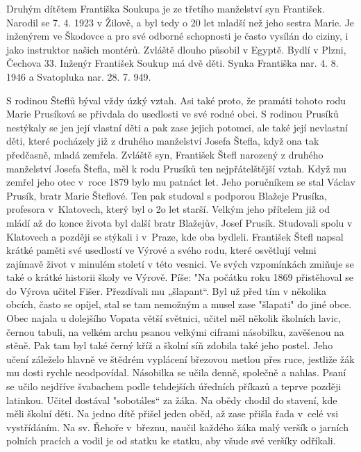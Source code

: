 \documentclass[../dejiny-rodu-prusiku.tex]{subfiles}
\begin{document}
Druhým dítětem Františka Soukupa je ze třetího manžel­ství syn František. Narodil se 7. 4. 1923 v Žilově, a byl tedy o 20 let mladší než jeho sestra Marie. Je inženýrem ve Škodovce a pro své odborné schopnosti je často vysílán do ciziny, i jako instruktor našich montérů. Zvláště dlouho působil v Egyptě. Bydlí v Plzni, Čechova 33. Inženýr František Soukup má dvě děti. Synka Františka nar. 4. 8. 1946 a Svatopluka nar. 28. 7. 949.

S rodinou Šteflů býval vždy úzký vztah. Asi také proto, že pramáti tohoto rodu Marie Prusíková se přivdala do usedlosti ve své rodné obci. S rodinou Prusíků nestýkaly se jen její vlastní děti a pak zase jejich potomci, ale také její nevlastní děti, které pocházely již z druhého manželství Josefa Štefla, když ona tak předčasně, mladá zemřela. Zvláště syn, František Štefl narozený z druhého manželství Josefa Štefla, měl k rodu Prusíků ten nejpřátelštější vztah. Když mu zemřel jeho otec v roce 1879 bylo mu patnáct let. Jeho poručníkem se stal Václav Prusík, bratr Marie Šteflové. Ten pak studoval s podporou Blažeje Prusíka, profesora v Klatovech, který byl o 2o let starší. Velkým jeho přítelem již od mládí až do konce života byl další bratr Blažejův, Josef Prusík. Studovali spolu v Klatovech a později se stýkali i v Praze, kde oba bydleli. František Štefl napsal krátké paměti své usedlostí ve Výrové a svého rodu, které osvět­lují velmi zajímavě život v minulém století v této vesnici. Ve svých vzpomínkách zmiňuje se také o krátké historii školy ve Výrově. Píše: "Na počátku roku 1869 přistěhoval se do Výrova učitel Fišer. Přezdívali mu „šlapant“. Byl už před tím v několika obcích, často se opíjel, stal se tam nemožným a musel zase "šlapati" do jiné obce. Obec najala u dolejšího Vopata větší světnici, učitel měl několik školních lavic, černou tabuli, na velkém archu psanou velkými ciframi násobilku, zavěšenou na stěně. Pak tam byl také černý kříž a školní síň zdobila také jeho postel. Jeho učení záleželo hlavně ve štědrém vyplácení březovou metlou přes ruce, jestliže žák mu dosti rychle neodpovídal. Násobilka se učila denně, společně a nahlas. Psaní se učilo nejdříve švabachem podle tehdejších úředních příkazů a teprve později latinkou. Učitel dostával "sobotáles“ za žáka. Na obědy chodil do stavení, kde měli školní děti. Na jedno dítě přišel jeden oběd, až zase přišla řada v celé vsi vystřídáním. Na sv. Řehoře v březnu, naučil každého žáka malý veršík o jarních polních pracích a vodil je od statku ke statku, aby všude své veršíky odříkali.
\end{document}
